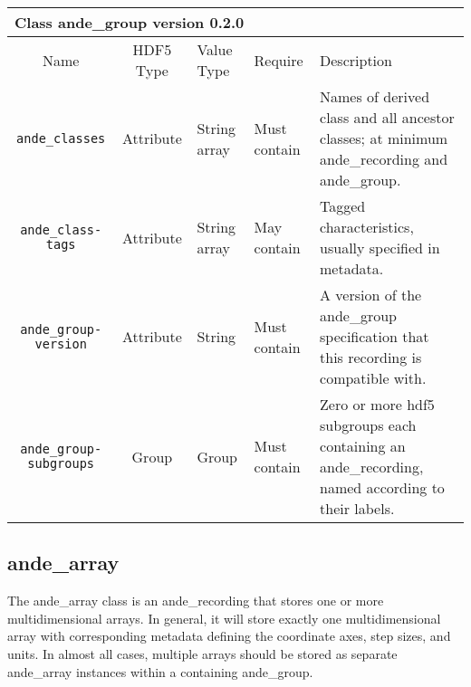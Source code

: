 \documentclass{article}
\newenvironment{AndeClass}[3]{
  
  \begin{tabular}{|c c p{.4in} p{.5in} p{2.9in}|}
    \multicolumn{5}{l}{{\Large \bf Class}{\Large \ttfamily \fontseries{b} #1} version #2 \ifthenelse{\equal{#3}{}}{}{; derives from #3}} \\
    \hline
    Name & HDF5 Type & Value Type & Require & Description \\
    \hline
}{
  \hline
  \end{tabular}
}
\newcommand{\AndeElementLine}[5]{{\tt #1} & #2 & #3 & #4 & #5 \\}
\newcommand{\AndeClassesLine}[1]{
  \AndeElementLine{ande\_classes}{Attribute}{String array}{Must contain}{
    Names of derived class and all ancestor classes; at minimum #1.
  }
}
\newcommand{\AndeClassTagsLine}[1]{
  \AndeElementLine{ande\_class-tags}{Attribute}{String array}{May contain}{
    Tagged characteristics, usually specified in metadata\ifthenelse{\equal{#1}{}}{}{; at minimum #1}.
  }
}
\begin{document}
\newcommand{\AndeGroupElements}{
    \AndeElementLine{ande\_group-version}{Attribute}{String}{Must contain}{
      A version of the ande\_group specification that this recording is compatible with.
    }
    \AndeElementLine{ande\_group-subgroups}{Group}{Group}{Must contain}{
      Zero or more hdf5 subgroups each containing an ande\_recording, named according to their labels.
    }
  }

\begin{AndeClass}{ande\_group}{0.2.0}{ande\_recording}
  \AndeClassesLine{ande\_recording and ande\_group}
  \AndeClassTagsLine{}
  \AndeRecordingElements
  \AndeGroupElements %
\end{AndeClass}

\subsection{ande\_array}
The ande\_array class is an ande\_recording that stores one or more multidimensional arrays. In general, it will store exactly one multidimensional array with corresponding metadata defining the coordinate axes, step sizes, and units. In almost all cases, multiple arrays should be stored as separate ande\_array instances within a containing ande\_group.
\end{document}

